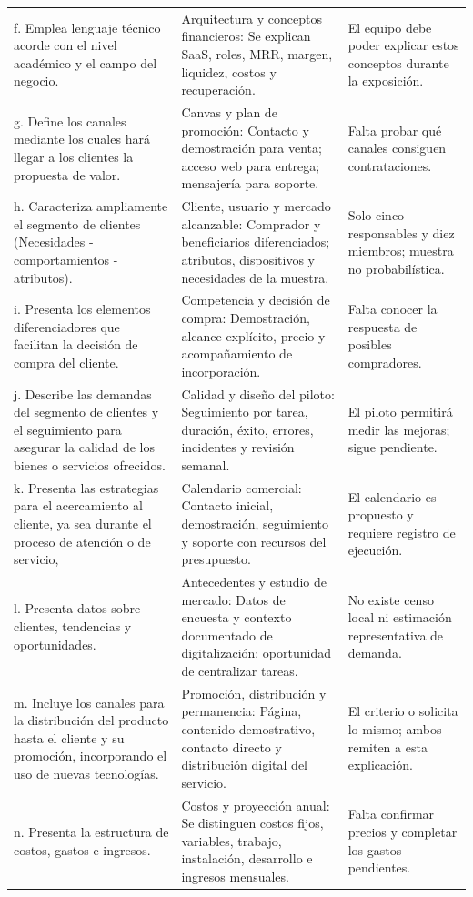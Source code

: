 \begin{longtable}{p{4.0cm}p{5.6cm}p{4.2cm}}
f. Emplea lenguaje técnico acorde con el nivel académico y el campo del negocio. & Arquitectura y conceptos financieros: Se explican SaaS, roles, MRR, margen, liquidez, costos y recuperación. & El equipo debe poder explicar estos conceptos durante la exposición. \\
g. Define los canales mediante los cuales hará llegar a los clientes la propuesta de valor. & Canvas y plan de promoción: Contacto y demostración para venta; acceso web para entrega; mensajería para soporte. & Falta probar qué canales consiguen contrataciones. \\
h. Caracteriza ampliamente el segmento de clientes (Necesidades - comportamientos - atributos). & Cliente, usuario y mercado alcanzable: Comprador y beneficiarios diferenciados; atributos, dispositivos y necesidades de la muestra. & Solo cinco responsables y diez miembros; muestra no probabilística. \\
i. Presenta los elementos diferenciadores que facilitan la decisión de compra del cliente. & Competencia y decisión de compra: Demostración, alcance explícito, precio y acompañamiento de incorporación. & Falta conocer la respuesta de posibles compradores. \\
j. Describe las demandas del segmento de clientes y el seguimiento para asegurar la calidad de los bienes o servicios ofrecidos. & Calidad y diseño del piloto: Seguimiento por tarea, duración, éxito, errores, incidentes y revisión semanal. & El piloto permitirá medir las mejoras; sigue pendiente. \\
k. Presenta las estrategias para el acercamiento al cliente, ya sea durante el proceso de atención o de servicio, & Calendario comercial: Contacto inicial, demostración, seguimiento y soporte con recursos del presupuesto. & El calendario es propuesto y requiere registro de ejecución. \\
l. Presenta datos sobre clientes, tendencias y oportunidades. & Antecedentes y estudio de mercado: Datos de encuesta y contexto documentado de digitalización; oportunidad de centralizar tareas. & No existe censo local ni estimación representativa de demanda. \\
m. Incluye los canales para la distribución del producto hasta el cliente y su promoción, incorporando el uso de nuevas tecnologías. & Promoción, distribución y permanencia: Página, contenido demostrativo, contacto directo y distribución digital del servicio. & El criterio o solicita lo mismo; ambos remiten a esta explicación. \\
n. Presenta la estructura de costos, gastos e ingresos. & Costos y proyección anual: Se distinguen costos fijos, variables, trabajo, instalación, desarrollo e ingresos mensuales. & Falta confirmar precios y completar los gastos pendientes. \\

\end{longtable}
